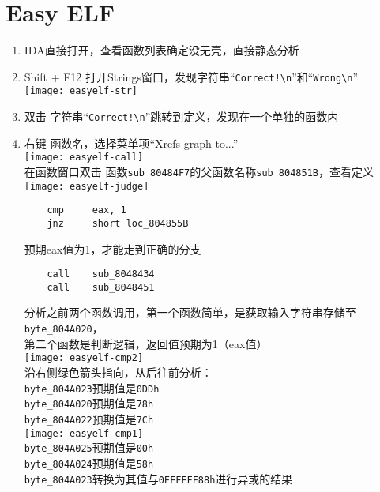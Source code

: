 \section{Easy ELF}
\begin{enumerate}
\item IDA直接打开，查看函数列表确定没无壳，直接静态分析\\
\item Shift + F12 打开Strings窗口，发现字符串“\lstinline$Correct!\n$”和“\lstinline$Wrong\n$”\\
	\texttt{[image: easyelf-str]} \\
\item 双击 字符串“\lstinline$Correct!\n$”跳转到定义，发现在一个单独的函数内 \\
\item 右键 函数名，选择菜单项“Xrefs graph to...” \\
	\texttt{[image: easyelf-call]} \\
	在函数窗口双击 函数\lstinline$sub_80484F7$的父函数名称\lstinline$sub_804851B$，查看定义 \\
	\texttt{[image: easyelf-judge]} \\
	\begin{lstlisting}
	cmp     eax, 1
	jnz     short loc_804855B
	\end{lstlisting}
	预期eax值为1，才能走到正确的分支 \\
	\begin{lstlisting}
	call    sub_8048434
	call    sub_8048451
	\end{lstlisting}
	分析之前两个函数调用，第一个函数简单，是获取输入字符串存储至\lstinline$byte_804A020$，\\
	第二个函数是判断逻辑，返回值预期为1（eax值）\\
	\texttt{[image: easyelf-cmp2]} \\
	沿右侧绿色箭头指向，从后往前分析：\\
	\lstinline$byte_804A023$预期值是\lstinline$0DDh$ \\
	\lstinline$byte_804A020$预期值是\lstinline$78h$ \\
	\lstinline$byte_804A022$预期值是\lstinline$7Ch$ \\
	\texttt{[image: easyelf-cmp1]} \\
	\lstinline$byte_804A025$预期值是\lstinline$00h$ \\
	\lstinline$byte_804A024$预期值是\lstinline$58h$ \\
	\lstinline$byte_804A023$转换为其值与\lstinline$0FFFFFF88h$进行异或的结果\\

\end{enumerate}

